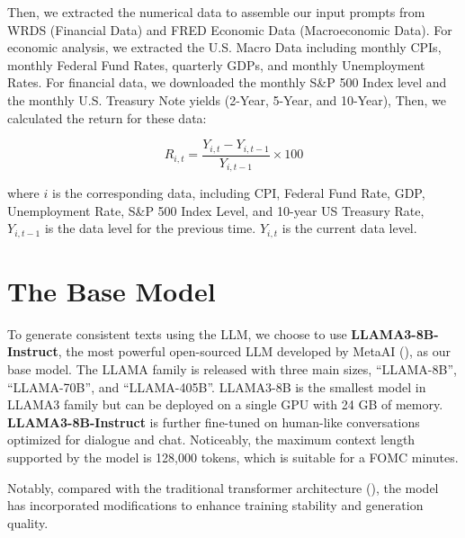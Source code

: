 



Then, we extracted the numerical data to assemble our input prompts from WRDS (Financial Data) and FRED Economic Data (Macroeconomic Data). For economic analysis, we extracted the U.S. Macro Data including monthly CPIs, monthly Federal Fund Rates, quarterly GDPs, and monthly Unemployment Rates. For financial data, we downloaded the monthly S\&P 500 Index level and the monthly U.S. Treasury Note yields (2-Year, 5-Year, and 10-Year), Then, we calculated the return for these data:

\begin{equation*}
    R_{i, t} = \frac{Y_{i, t} - Y_{i, t-1}}{Y_{i, t-1}} \times 100
\end{equation*}

where $i$ is the corresponding data, including CPI, Federal Fund Rate, GDP, Unemployment Rate, S\&P 500 Index Level, and 10-year US Treasury Rate, $Y_{i, t-1}$ is the data level for the previous time. $Y_{i, t}$ is the current data level.

\section{The Base Model}\label{ch2:sec:llm}
To generate consistent texts using the LLM, we choose to use \textbf{LLAMA3-8B-Instruct}, the most powerful open-sourced LLM developed by MetaAI (\cite{meta2024llama3}), as our base model. The LLAMA family is released with three main sizes, ``LLAMA-8B'', ``LLAMA-70B'', and ``LLAMA-405B''. LLAMA3-8B is the smallest model in LLAMA3 family but can be deployed on a single GPU with 24 GB of memory. \textbf{LLAMA3-8B-Instruct} is further fine-tuned on human-like conversations optimized for dialogue and chat. Noticeably, the maximum context length supported by the model is 128,000 tokens, which is suitable for a FOMC minutes. 


Notably, compared with the traditional transformer architecture (\cite{vaswani-etal2018}), the model has incorporated modifications to enhance training stability and generation quality. 


